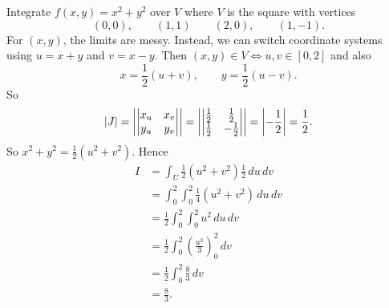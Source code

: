 \begin{example}
    Integrate $f(x,y) = x^2 + y^2$ over $V$
    where $V$ is the square with vertices
    \[
        (0,0), \qquad (1,1) \qquad (2,0), \qquad (1,-1).
    \]
    For $(x,y)$, the limits are messy. 
    Instead, we can switch coordinate systems using $u = x + y$
    and $v = x - y$.
    Then $(x,y) \in V \iff u,v \in [0,2]$
    and also
    \[
        x = \frac{1}{2} (u + v), \qquad y = \frac12 (u - v).
    \]
    So
    \[
        \left\lvert J\right\rvert = \left\lvert
            \begin{vmatrix}
                x_u & x_v \\
                y_u & y_v \\
            \end{vmatrix}
        \right\rvert
        = \left\lvert
            \begin{vmatrix}
                \frac12 & \frac12 \\
                \frac12 & -\frac12 \\
            \end{vmatrix}
        \right\rvert
        = \left\lvert-\frac12\right\rvert = \frac12.
    \]
    So $x^2 + y^2 = \frac12(u^2 + v^2)$.
    Hence
    \begin{align*}
        I
        &= \int_U \frac12(u^2 + v^2) \frac12 \,du\,dv \\
        &= \int_0^2 \int_0^2 \frac14 (u^2 + v^2) \,du\,dv \\
        &= \frac12 \int_0^2\int_0^2 u^2 \,du\,dv \\
        &= \frac12 \int_0^2 \left(\frac{u^3}3\right)^2_0 \,dv \\
        &= \frac12 \int_0^2 \frac83 \,dv \\
        &= \frac83.
    \end{align*}
\end{example}
